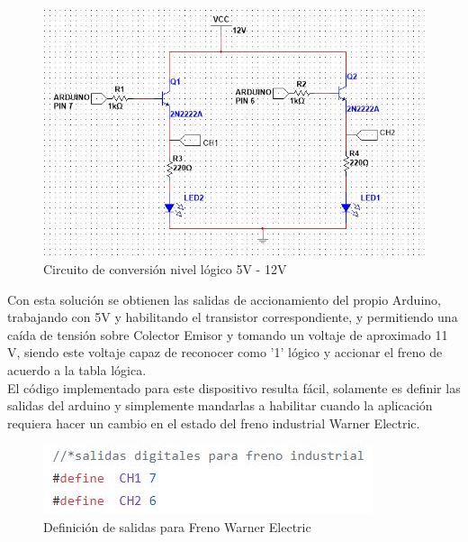 \documentclass[12pt,titlepage]{article}
\begin{document}
\begin{figure}[htbp]
\hspace*{1.8cm} 
\includegraphics[scale=0.73]{CIRCUIT}
\caption{Circuito de conversión nivel lógico 5V - 12V}
\end{figure}
\newpage
Con esta solución se obtienen las salidas de accionamiento del propio Arduino, trabajando con 5V y habilitando el transistor correspondiente, y permitiendo una caída de tensión sobre Colector Emisor y tomando un voltaje de aproximado 11 V, siendo este voltaje capaz de reconocer como '1' lógico y accionar el freno de acuerdo a la tabla lógica. \\

El código implementado para este dispositivo resulta fácil, solamente es definir las salidas del arduino y simplemente mandarlas a habilitar cuando la aplicación requiera hacer un cambio en el estado del freno industrial Warner Electric. \\ 

\begin{figure}[htbp]
\hspace*{3.8cm} 
\includegraphics[scale=0.92]{salidas_freno}
\caption{Definición de salidas para Freno Warner Electric}
\end{figure}
\end{document}
